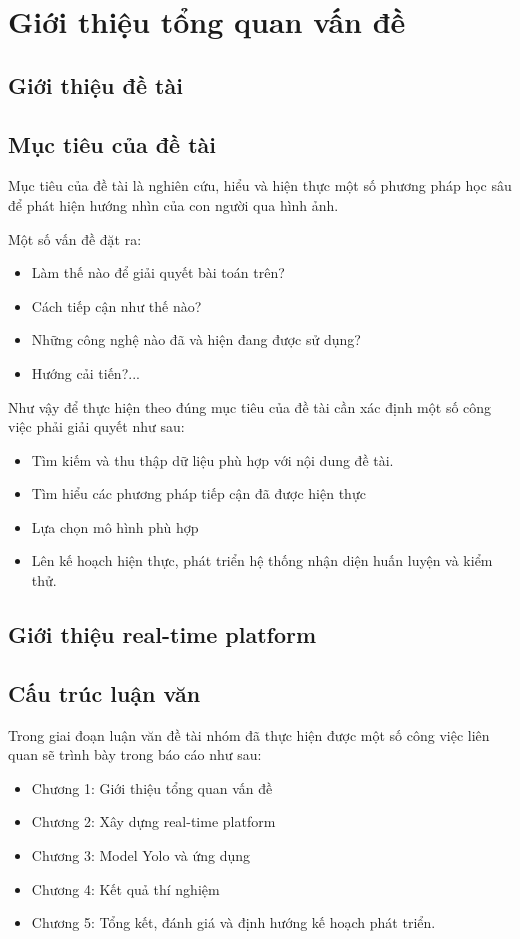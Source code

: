 \chapter{Giới thiệu tổng quan vấn đề}
	
\section{Giới thiệu đề tài}

\section{Mục tiêu của đề tài}
Mục tiêu của đề tài là nghiên cứu, hiểu và hiện thực một số phương pháp học sâu để phát hiện hướng nhìn của con người qua hình ảnh.

Một số vấn đề đặt ra: 
\begin{itemize}
\item Làm thế nào để giải quyết bài toán trên?
\item Cách tiếp cận như thế nào?
\item Những công nghệ nào đã và hiện đang được sử dụng?
\item Hướng cải tiến?...
\end{itemize}

Như vậy để thực hiện theo đúng mục tiêu của đề tài cần xác định một số công việc phải giải quyết như sau:
\begin{itemize}
\item Tìm kiếm và thu thập dữ liệu phù hợp với nội dung đề tài.
\item Tìm hiểu các phương pháp tiếp cận đã được hiện thực
\item Lựa chọn mô hình phù hợp
\item Lên kế hoạch hiện thực, phát triển hệ thống nhận diện huấn luyện và kiểm thử.
\end{itemize}
\section{Giới thiệu real-time platform}
\section{Cấu trúc luận văn}
Trong giai đoạn luận văn đề tài nhóm đã thực hiện được một số công việc liên quan sẽ trình bày trong báo cáo như sau:

\begin{itemize}
\item Chương 1: Giới thiệu tổng quan vấn đề
\item Chương 2: Xây dựng real-time platform
\item Chương 3: Model Yolo và ứng dụng
\item Chương 4: Kết quả thí nghiệm
\item Chương 5: Tổng kết, đánh giá và định hướng kế hoạch phát triển.
\end{itemize}
